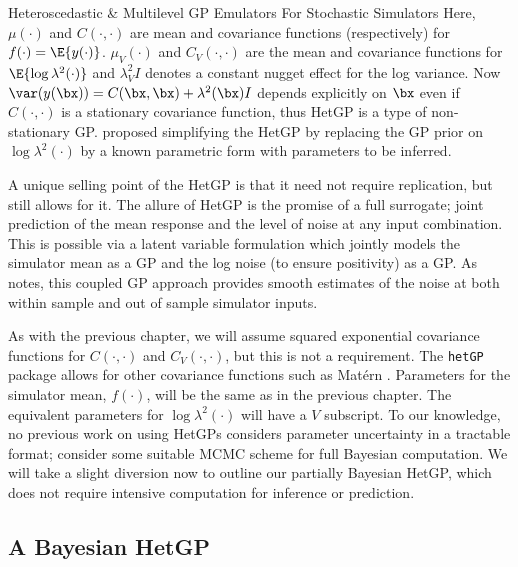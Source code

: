 \begin{chapter}{Heteroscedastic \& Multilevel GP Emulators For Stochastic Simulators\label{Ch:Hetsml}}
Here, $\mu(\cdot)$ and $C(\cdot, \cdot)$ are mean and covariance functions (respectively) for $f(\cdot) = \E \{y(\cdot)\}$. $\mu_V(\cdot)$ and $C_V(\cdot, \cdot)$ are the mean and covariance functions for $\E\{ \log \lambda^2(\cdot) \}  $ and $\lambda_V^2 I$ denotes a constant nugget effect for the log variance. Now $\var(y(\bx)) = C(\bx, \bx) + \lambda^2(\bx)I$ depends explicitly on $\bx$ even if $C(\cdot, \cdot)$ is a stationary covariance function, thus HetGP is a type of non-stationary GP. \citet{Boukouvalas2010} proposed simplifying the HetGP by replacing the GP prior on $\log \lambda^2 (\cdot)$ by a known parametric form with parameters to be inferred.

A unique selling point of the HetGP is that it need not require replication, but still allows for it. The allure of HetGP is the promise of a full surrogate; joint prediction of the mean response and the level of noise at any input combination. This is possible via a latent variable formulation which jointly models the simulator mean as a GP and the log noise (to ensure positivity) as a GP. As \citet{Gramacy2020surrogates} notes, this coupled GP approach provides smooth estimates of the noise at both within sample and out of sample simulator inputs.

As with the previous chapter, we will assume squared exponential covariance functions for $C(\cdot, \cdot)$ and $C_V(\cdot, \cdot)$, but this is not a requirement. The \texttt{hetGP} package allows for other covariance functions such as Mat\'ern \cite{hetGP}. Parameters for the simulator mean, $f(\cdot)$, will be the same as in the previous chapter. The equivalent parameters for $\log \lambda^2 (\cdot)$ will have a $V$ subscript. To our knowledge, no previous work on using HetGPs considers parameter uncertainty in a tractable format; \citet{Goldberg1998} consider some suitable MCMC scheme for full Bayesian computation. We will take a slight diversion now to outline our partially Bayesian HetGP, which does not require intensive computation for inference or prediction.

\subsection{A Bayesian HetGP}


\end{chapter}
